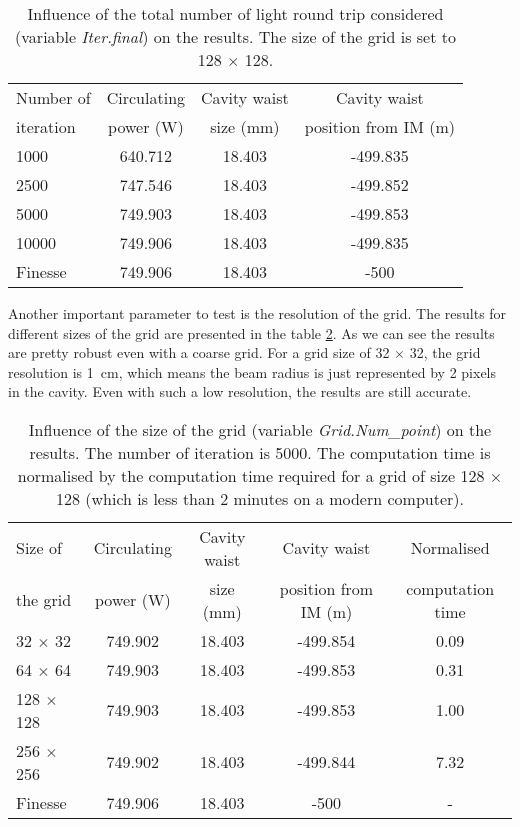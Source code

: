 \begin{table}[tbp]
  \centering
  \caption{\label{tab2:RT} Influence of the total number of light round trip considered (variable \emph{Iter.final}) on the results. The size of the grid is set to 128 $\times$ 128.}
\begin{tabular}{|l|c|c|c|}
\hline
Number of  & Circulating & Cavity waist & Cavity waist \\
iteration &  power (W) & size (mm) &  position from IM (m) \\
\hline
1000 &  640.712 &  18.403 & -499.835 \\
2500 &  747.546 &  18.403 & -499.852 \\
5000 &  749.903 &  18.403 & -499.853 \\
10000 &  749.906 &  18.403 & -499.835 \\
\hline
\hline
Finesse &  749.906 &  18.403 & -500 \\
\hline
\end{tabular}
\end{table}

Another important parameter to test is the resolution of the grid. The results for different sizes of the grid are presented in the table \ref{tab2:grid_size}. As we can see the results are pretty robust even with a coarse grid. For a grid size of 32 $\times$ 32, the grid resolution is 1~cm, which means the beam radius is just represented by 2 pixels in the cavity. Even with such a low resolution, the results are still accurate.

\begin{table}[tbp]
  \centering
  \caption{\label{tab2:grid_size} Influence of the size of the grid (variable \emph{Grid.Num\_point}) on the results. The number of iteration is 5000. The computation time is normalised by the computation time required for a grid of size 128 $\times$ 128 (which is less than 2 minutes on a modern computer).}
\begin{tabular}{|l|c|c|c|c|}
\hline
Size of   & Circulating & Cavity waist & Cavity waist & Normalised \\
the grid &  power (W) & size (mm) &  position from IM (m) & computation time\\
\hline
32 $\times$ 32 &  749.902 &  18.403 & -499.854 & 0.09 \\
64 $\times$ 64 &  749.903 &  18.403 & -499.853 & 0.31 \\
128 $\times$ 128 &  749.903 &  18.403 & -499.853 & 1.00 \\
256 $\times$ 256 &  749.902 & 18.403 & -499.844 & 7.32\\
\hline
\hline
Finesse &  749.906 &  18.403 & -500 & - \\
\hline
\end{tabular}
\end{table}


